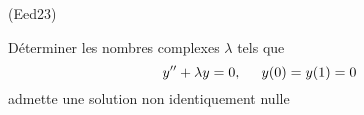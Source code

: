 \begin{tiny}(Eed23)\end{tiny} Déterminer les nombres complexes $\lambda$ tels que 
\[
 y'' + \lambda y = 0, \hspace{0.5cm} y(0)=y(1) = 0
\]
admette une solution non identiquement nulle